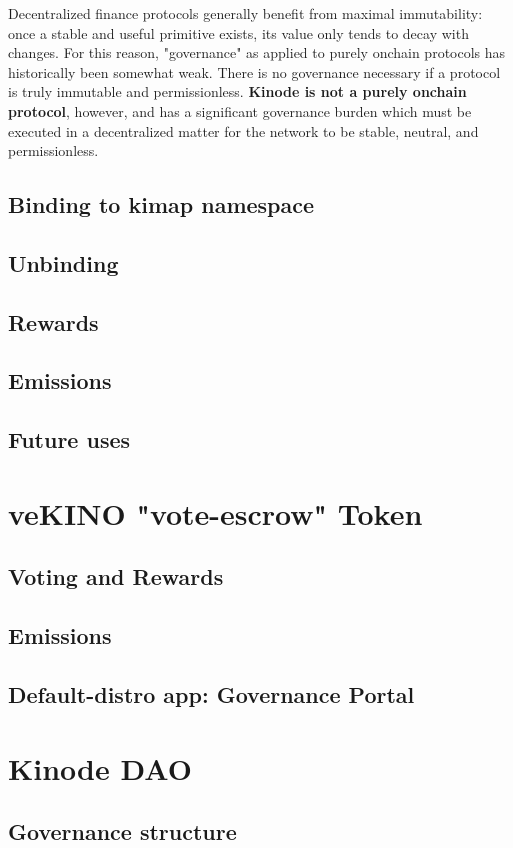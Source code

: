 \documentclass[runningheads]{llncs}
\begin{document}
Decentralized finance protocols generally benefit from maximal immutability: once a stable and useful primitive exists, its value only tends to decay with changes.
For this reason, "governance" as applied to purely onchain protocols has historically been somewhat weak.
There is no governance necessary if a protocol is truly immutable and permissionless. \textbf{Kinode is not a purely onchain protocol}, however, and has a significant governance burden which must be executed in a decentralized matter for the network to be stable, neutral, and permissionless.

\subsection{Binding to kimap namespace}
\subsection{Unbinding}
\subsection{Rewards}
\subsection{Emissions}
\subsection{Future uses}
%
%
%
\section{veKINO "vote-escrow" Token}
\subsection{Voting and Rewards}
\subsection{Emissions}
\subsection{Default-distro app: Governance Portal}
%
%
%
\section{Kinode DAO}
\subsection{Governance structure}
\end{document}
